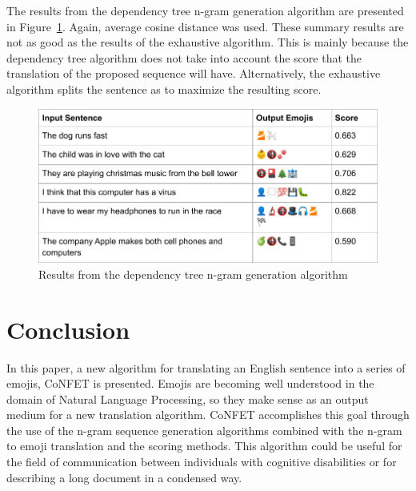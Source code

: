 \documentclass{article}[10]
\begin{document}
The results from the dependency tree n-gram generation algorithm are presented
in Figure~\ref{fig:dependency}. Again, average cosine distance was used. These
summary results are not as good as the results of the exhaustive algorithm. This
is mainly because the dependency tree algorithm does not take into account the
score that the translation of the proposed sequence will have. Alternatively,
the exhaustive algorithm splits the sentence as to maximize the resulting score.

\begin{figure}[H]
  \begin{center}
    \includegraphics[width=\columnwidth]{figures/dependency.png}
    \caption{Results from the dependency tree n-gram generation
      algorithm\label{fig:dependency}}
  \end{center}
\end{figure}

\section{Conclusion}

In this paper, a new algorithm for translating an English sentence into a series
of emojis, CoNFET is presented. Emojis are becoming well understood in the
domain of Natural Language Processing, so they make sense as an output medium
for a new translation algorithm. CoNFET accomplishes this goal through the use
of the n-gram sequence generation algorithms combined with the n-gram to emoji
translation and the scoring methods. This algorithm could be useful for the
field of communication between individuals with cognitive disabilities or for
describing a long document in a condensed way.
\end{document}
